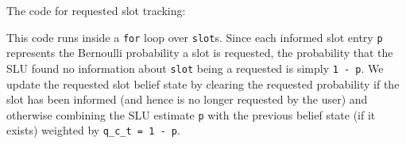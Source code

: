 \documentclass[a4paper,oneside,reqno]{amsart}
\begin{document}
\begin{enumerate}
    The code for requested slot tracking:
    
		This code runs inside a \texttt{for} loop over \texttt{slot}s. Since each informed
		slot entry \texttt{p} represents the Bernoulli probability a slot is requested, the probability
		that the SLU found no information about \texttt{slot} being a requested is simply
		\texttt{1 - p}. We update the requested slot belief state by clearing the requested
		probability if the slot has been informed (and hence is no longer requested by the user)
		and otherwise combining the SLU estimate \texttt{p} with the previous belief state
		(if it exists) weighted by \texttt{q\_c\_t = 1 - p}.
\end{enumerate}
\end{document}
